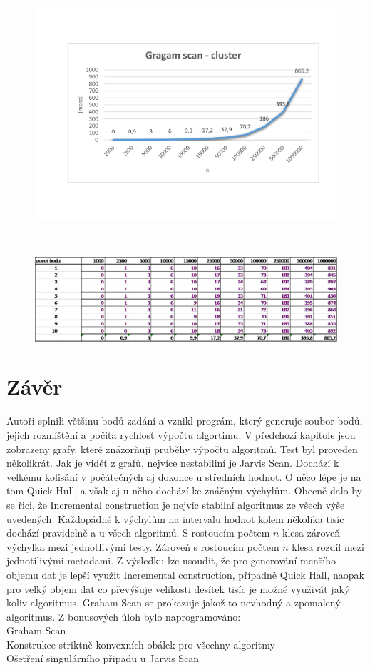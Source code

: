 \documentclass{article}
\begin{document}
\begin{figure}[htbp]
\centering
        \includegraphics[clip, trim=0cm 0cm 0cm 0cm, width=1\textwidth]{gc.pdf}
\end{figure}
\\
\begin{figure}[htbp]
\centering
        \includegraphics[clip, trim=0cm 0cm 0cm 0cm, width=1\textwidth]{gc.png}
\end{figure}
\bigskip
\clearpage
\section{Závěr}
\indent Autoři splnili většinu bodů zadání a vznikl prográm, který generuje soubor bodů, jejich rozmíštění a počita rychlost výpočtu algortimu.
V předchozí kapitole jsou zobrazeny grafy, které znázorňují pruběhy výpočtu algoritmů. Test byl proveden několikrát. Jak je vidět z grafů, nejvíce nestabiliní je Jarvis Scan. Dochází k velkému kolisání v počátečných aj dokonce u středních hodnot. O něco lépe je na tom Quick Hull, a však aj u něho dochází ke znáčným výchylům. Obecně dalo by se řici, že Incremental construction je nejvíc stabilní algoritmus ze všech výše uvedených.
Každopádně k výchylům na intervalu hodnot kolem několika tisíc dochází pravidelně a u všech algoritmů. S rostoucím počtem $n$ klesa zároveň výchylka mezi jednotlivými testy. Zároveň s rostoucím počtem $n$ klesa rozdíl mezi jednotilivými metodami. 
Z výsledku lze usoudit, že pro generování menšího objemu dat je lepší využit Incremental construction, případně Quick Hall, naopak pro velký objem dat co převýšuje velikosti desítek tisíc je možné využivát jaký koliv algoritmus.
 Graham Scan se prokazuje jakož to nevhodný a zpomalený algoritmus. 
 Z bonusových úloh bylo naprogramováno:
 \\Graham Scan
\\Konstrukce striktně konvexních obálek pro všechny algoritmy
\\Ošetření singulárního připadu u Jarvis Scan
\end{document}
